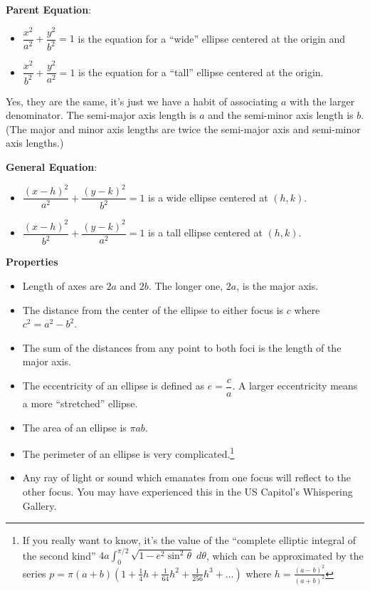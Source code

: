 \documentclass[11pt]{article}
\begin{document}
\textbf{Parent Equation}:
  \begin{itemize}
		\item \(\dfrac{x^2}{a^2}+\dfrac{y^2}{b^2}=1\) is the
equation for a ``wide'' ellipse centered at the origin and
    \item \(\displaystyle \dfrac{x^2}{b^2}+\dfrac{y^2}{a^2}=1\) is the
   equation for a ``tall'' ellipse centered at the origin.
	\end{itemize}
Yes, they are the same,
it's just we have a habit of associating $a$ with the larger denominator.
The semi-major axis
length is $a$ and the semi-minor axis length is $b$.
(The major and minor axis lengths are twice the semi-major axis and
semi-minor axis lengths.)

\textbf{General Equation}:
\begin{itemize}
  \item \(\dfrac{(x-h)^2}{a^2} + \dfrac{(y-k)^2}{b^2} = 1\) is a wide ellipse
centered at \((h,k)\).
  \item \(\dfrac{(x-h)^2}{b^2} + \dfrac{(y-k)^2}{a^2} = 1\) is a tall ellipse
  centered at \((h,k)\).
\end{itemize}
\textbf{Properties}

\begin{itemize}

\item
  Length of axes are \(2a\) and \(2b\). The longer one, $2a$, is the major
  axis.
\item
  The distance from the center of the ellipse to either focus is \(c\)
  where \(c^2 = a^2-b^2\).
\item
  The sum of the distances from any point to both foci is the length of the
	major axis.
\item
  The eccentricity of an ellipse is defined as \(e = \dfrac{c}{a}\). A larger eccentricity
	means a more ``stretched'' ellipse.
\item
  The area of an ellipse is \(\pi a b\).
\item
  The perimeter of an ellipse is very complicated.\footnote{If you really
    want to know, it's the value of the ``complete elliptic integral of
    the second kind''
    \(4a \int_0^{\pi/2} \sqrt{1 - e^2 \sin^2 \theta} \; d\theta\), which
    can be approximated by the series
    \(p = \pi(a+b)\left(1 + \frac14 h + \frac{1}{64}h^2 + \frac{1}{256}h^3 + \ldots\right)\)
    where \(h = \frac{(a-b)^2}{(a+b)^2}\)}
\item
  Any ray of light or sound which emanates from one focus will reflect
  to the other focus. You may have experienced this in the US Capitol's
  Whispering Gallery.
\end{itemize}
\end{document}
